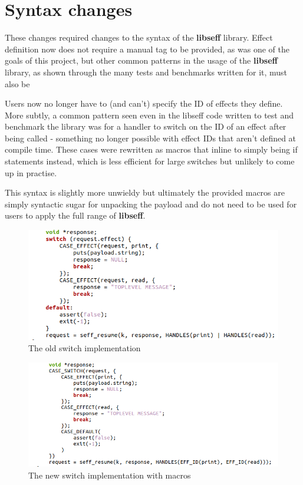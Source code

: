 \documentclass[logo,bsc,singlespacing,parskip,online]{infthesis}
\begin{document}
\section{Syntax changes} \label{Syntax}

These changes required changes to the syntax of the \textbf{libseff} library. Effect definition now does not require a manual tag to be provided, as was one of the goals of this project, but other common patterns in the usage of the \textbf{libseff} library, as shown through the many tests and benchmarks written for it, must also be 

Users now no longer have to (and can't) specify the ID of effects they define. More subtly, a common pattern seen even in the libseff code written to test and benchmark the library was for a handler to switch on the ID of an effect after being called - something no longer possible with effect IDs that aren't defined at compile time. These cases were rewritten as macros that inline to simply being if statements instead, which is less efficient for large switches but unlikely to come up in practise.

This syntax is slightly more unwieldy but ultimately the provided macros are simply syntactic sugar for unpacking the payload and do not need to be used for users to apply the full range of \textbf{libseff}.

\begin{figure}[ht]
    \centering
    \includegraphics[width=1\linewidth]{oldswitch.png}
    \caption{The old switch implementation}
    \label{fig:oldswitch}
\end{figure}

\begin{figure}[ht]
    \centering
    \includegraphics[width=1\linewidth]{newswitch.png}
    \caption{The new switch implementation with macros}
    \label{fig:newswitch}
\end{figure}
\end{document}
